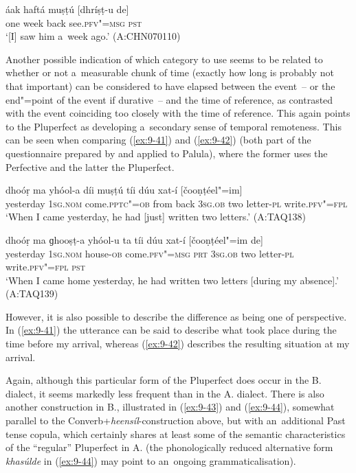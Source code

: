 \begin{exe}
\ex
\label{ex:9-40}
\gll áak haftá muṣṭú [dhríṣṭ-u de]  \\
one week back see.\textsc{pfv"=msg} \textsc{pst} \\
\glt `[I] saw him a~week ago.' (A:CHN070110)
\end{exe}

Another possible indication of which category to use seems to be related to whether or not a~measurable chunk of time (exactly how long is probably not that important) can be considered to have elapsed between the event~-- or the end"=point of the event if durative~-- and the time of reference, as contrasted with the event coinciding too closely with the time of reference. This again points to the Pluperfect as developing a~secondary sense of temporal remoteness. This can be seen when comparing (\ref{ex:9-41}) and (\ref{ex:9-42}) (both part of the questionnaire prepared by \citet{dahl1985} and applied to Palula), where the former uses the Perfective and the latter the Pluperfect.

\begin{exe}
\ex
\label{ex:9-41}
\gll \label{bkm:Ref190742986}dhoóṛ ma yhóol-a díi muṣṭú tíi dúu xat-í [čooṇṭéel"=im] \\
yesterday 1\textsc{sg.nom} come.\textsc{pptc"=ob} from back \textsc{3sg.ob} two letter-\textsc{pl} write.\textsc{pfv"=fpl} \\
\glt `When I came yesterday, he had [just] written two letters.' (A:TAQ138)

\ex
\label{ex:9-42}
\gll dhoóṛ ma ɡhooṣṭ-a yhóol-u ta tíi dúu xat-í [čooṇṭéel"=im de] \\
yesterday 1\textsc{sg.nom} house-\textsc{ob} come.\textsc{pfv"=msg}  \textsc{prt} \textsc{3sg.ob} two letter-\textsc{pl} write.\textsc{pfv"=fpl} \textsc{pst} \\
\glt `When I came home yesterday, he had written two letters [during my absence].' (A:TAQ139)
\end{exe}

However, it is also possible to describe the difference as being one of perspective. In (\ref{ex:9-41}) the utterance can be said to describe what took place during the time before my arrival, whereas (\ref{ex:9-42}) describes the resulting situation at my arrival.


Again, although this particular form of the Pluperfect does occur in the B. dialect, it seems markedly less frequent than in the A. dialect. There is also another construction in B., illustrated in (\ref{ex:9-43}) and (\ref{ex:9-44}), somewhat parallel to the Converb+\textit{heensíl}-construction above, but with an~additional Past tense copula, which certainly shares at least some of the semantic characteristics of the ``regular'' Pluperfect in A. (the phonologically reduced alternative form \textit{khasúlde} in (\ref{ex:9-44}) may point to an~ongoing grammaticalisation).

